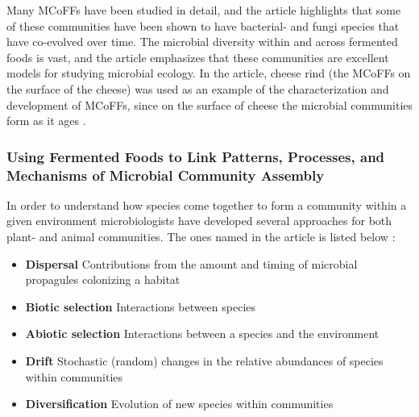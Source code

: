 Many MCoFFs have been studied in detail, and the article highlights that some of these communities have been shown to have bacterial- and fungi species that have co-evolved over time. The microbial diversity within and across fermented foods is vast, and the article emphasizes that these communities are excellent models for studying microbial ecology. In the article, cheese rind (the MCoFFs on the surface of the cheese) was used as an example of the characterization and development of MCoFFs, since on the surface of cheese the microbial communities form as it ages \cite*{L1-FermentedFoods}.

\subsubsection*{Using Fermented Foods to Link Patterns, Processes, and Mechanisms of Microbial Community Assembly}

In order to understand how species come together to form a community within a given environment microbiologists have developed several approaches for both plant- and animal communities. The ones named in the article is listed below \cite*{L1-FermentedFoods}: 

\begin{highlight}
    \begin{itemize}
        \item \textbf{Dispersal}
        \subitem Contributions from the amount and timing of microbial propagules colonizing a habitat
        \vspace*{0.3em}

        \item \textbf{Biotic selection}
        \subitem Interactions between species
        \vspace*{0.3em}

        \item \textbf{Abiotic selection}
        \subitem Interactions between a species and the environment
        \vspace*{0.3em}

        \item \textbf{Drift}
        \subitem Stochastic (random) changes in the relative abundances of species within communities
        \vspace*{0.3em}

        \item \textbf{Diversification}
        \subitem Evolution of new species within communities
    \end{itemize}
\end{highlight}

